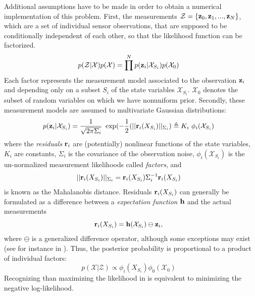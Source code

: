 Additional assumptions have to be made in order to obtain a numerical implementation of this problem.
First, the measurements $\mathcal{Z} = \{{\bf z}_0, {\bf z}_1, ..., {\bf z}_N\} $, which are a set of individual sensor observations, that are supposed to be conditionally 
independent of each other, so that the likelihood function can be factorized. 
%
\begin{equation}
    p(\mathcal{Z} | \mathcal{X}) p(\mathcal{X}) = \prod^{N} p({\bf z}_i | \mathcal{X}_{S_i}) p(\mathcal{X}_0)
\end{equation}
%
Each factor represents the measurement model associated to the 
observation ${\bf z}_i$ and depending only on a subset $S_i$ of the state variables $\mathcal{X}_{S_i}$. 
$\mathcal{X}_0$ denotes the subset of random variables on which we have nonuniform prior.
Secondly, these measurement models are assumed to multivariate Gaussian distributions:
%
\begin{equation}
    p({\bf z}_i | \mathcal{X}_{S_i}) = \frac{1}{\sqrt{2\pi\Sigma_i}} ~ \exp(- \frac{1}{2} (||{\bf r}_i(X_{S_i})||_{\Sigma_i}) \triangleq K_i~\phi_i(\mathcal{X}_{S_i})
\end{equation}
%
where the \textit{residuals} ${\bf r}_i$ are (potentially) nonlinear functions of the state variables, $K_i$ are constants, $\Sigma_i$ is the covariance of the observation noise,
$\phi_i(\mathcal{X}_{S_i})$ is the un-normalized measurement likelihoods called \textit{factors},
and 
%
\begin{equation*}
    ||{\bf r}_i(X_{S_i})||_{\Sigma_i} = {\bf r}_i(X_{S_i}) \Sigma_i^{-1} {\bf r}_i(X_{S_i})    
\end{equation*}
%
is known as the Mahalanobis distance. 
Residuals ${\bf r}_i(X_{S_i})$ can generally be formulated as a difference between a \textit{expectation function} ${\bf h}$ and the actual measurements
%
\begin{equation}
    {\bf r}_i(X_{S_i}) = {\bf h}(\mathcal{X}_{S_i}) \ominus {\bf z}_i,
\end{equation}
%
where $\ominus$ is a generalized difference operator,
although some exceptions may exist (see for instance  in ).
%
Thus, the posterior probability is proportional to a product of individual factors:
%
\begin{equation}
    p(\mathcal{X} | \mathcal{Z}) \propto \phi_i(X_{S_i}) \phi_0(\mathcal{X}_{0})
    \label{eq:likelihood_factorization}
\end{equation}
%
Recognizing than maximizing the likelihood in  is equivalent to minimizing the negative log-likelihood.
